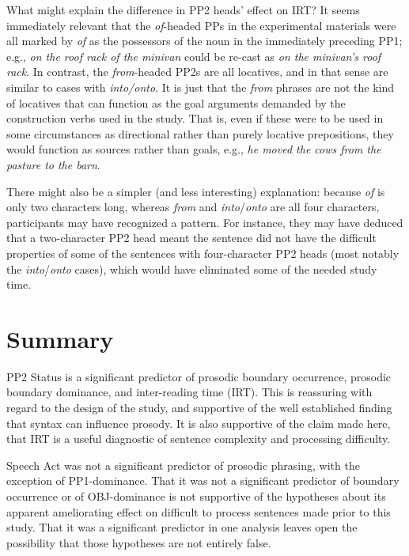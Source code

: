 \documentclass[11pt,oneside]{book}
\begin{document}
What might explain the difference in PP2 heads' effect on IRT? It seems immediately relevant that the \emph{of}-headed PPs in the experimental materials were all marked by \emph{of} as the possessors of the noun in the immediately preceding PP1; e.g., \emph{on the roof rack of the minivan} could be re-cast as \emph{on the minivan's roof rack}. In contrast, the \emph{from}-headed PP2s are all locatives, and in that sense are similar to cases with \emph{into/onto}. It is just that the \emph{from} phrases are not the kind of locatives that can function as the goal arguments demanded by the construction verbs used in the study. That is, even if these were to be used in some circumstances as directional rather than purely locative prepositions, they would function as sources rather than goals, e.g., \emph{he moved the cows from the pasture to the barn}.

There might also be a simpler (and less interesting) explanation: because \emph{of} is only two characters long, whereas \emph{from} and \emph{into}/\emph{onto} are all four characters, participants may have recognized a pattern. For instance, they may have deduced that a two-character PP2 head meant the sentence did not have the difficult properties of some of the sentences with four-character PP2 heads (most notably the \emph{into}/\emph{onto} cases), which would have eliminated some of the needed study time.

\hypertarget{summary}{%
\section{Summary}\label{summary}}

PP2 Status is a significant predictor of prosodic boundary occurrence, prosodic boundary dominance, and inter-reading time (IRT). This is reassuring with regard to the design of the study, and supportive of the well established finding that syntax can influence prosody. It is also supportive of the claim made here, that IRT is a useful diagnostic of sentence complexity and processing difficulty.

Speech Act was not a significant predictor of prosodic phrasing, with the exception of PP1-dominance. That it was not a significant predictor of boundary occurrence or of OBJ-dominance is not supportive of the hypotheses about its apparent ameliorating effect on difficult to process sentences made prior to this study. That it was a significant predictor in one analysis leaves open the possibility that those hypotheses are not entirely false.
\end{document}

